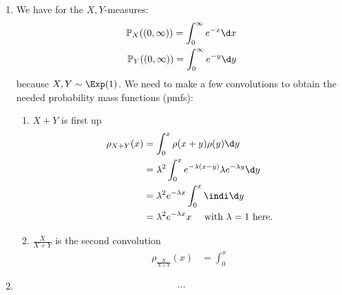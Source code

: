 \subsection{}
\begin{solution}
	\begin{enumerate}
		\item We have for the $X,Y$-measures:
		\begin{align*}
			\meas_X ((0,\infty)) = \int_{0}^{\infty} e^{-x} \d x\\
			\meas_Y ((0,\infty)) = \int_{0}^{\infty} e^{-y} \d y
		\end{align*}
		because $X,Y \sim \Exp(1)$.
		We need to make a few convolutions to obtain the needed probability mass functions (pmfs):
		\begin{enumerate}
			\item $X+Y$ is first up
			\begin{align*}
				\rho_{X+Y}(x) &= \int_{0}^x \rho(x+y)\rho(y) \d y\\
				&= \lambda^2 \int_{0}^x e^{-\lambda(x-y)}\lambda e^{-\lambda y}\d y\\
				&= \lambda^2 e^{-\lambda x} \int_{0}^x \indi \d y\\
				&= \lambda^2 e^{-\lambda x} x \quad\text{ with } \lambda = 1 \text{ here.}
			\end{align*}
			\item $\frac{X}{X+Y}$ is the second convolution
			\begin{align*}
				\rho_{\frac{X}{X+Y}} (x) &= \int_0^x
			\end{align*}
		\end{enumerate}
		\item  
		\begin{align*}
			...
		\end{align*}
	\end{enumerate}
\end{solution}
